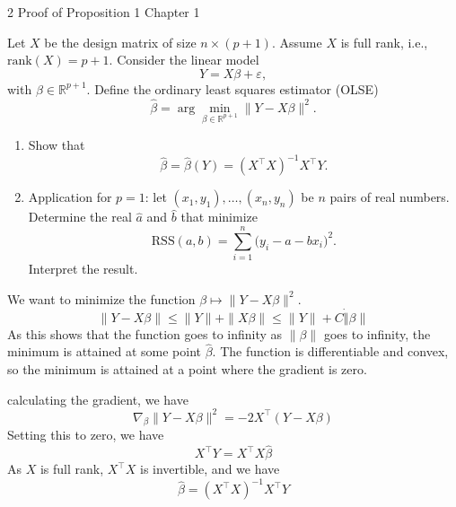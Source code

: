 \begin{exercisebox}{2 Proof of Proposition 1 Chapter 1}

  Let $X$ be the design matrix of size $n\times(p+1)$. Assume $X$ is full rank, i.e., $\mathrm{rank}(X)=p+1$. Consider the linear model
  \[
    Y = X\beta + \varepsilon,
  \]
  with $\beta\in\mathbb{R}^{p+1}$. Define the ordinary least squares estimator (OLSE)
  \[
    \widehat{\beta} = \arg\min_{\beta\in\mathbb{R}^{p+1}} \|Y - X\beta\|^2.
  \]

  \begin{enumerate}
    \item Show that
    \[
      \widehat{\beta} = \widehat{\beta}(Y) = (X^{\top}X)^{-1}X^{\top}Y.
    \]
    \item Application for $p=1$:
    let $(x_1,y_1),\ldots,(x_n,y_n)$ be $n$ pairs of real numbers. Determine the real
    $\hat a$ and $\hat b$ that minimize
    \[
      \mathrm{RSS}(a,b) = \sum_{i=1}^n \bigl(y_i - a - b x_i\bigr)^2.
    \]
    Interpret the result.
  \end{enumerate}
\end{exercisebox}

\begin{answerenum}
    \item We want to minimize the function \( \beta \mapsto \| Y - X\beta \|^2 \).
        \[
          \| Y - X\beta \| \leq \| Y \| + \| X\beta \| \leq \|Y\| + C \dot \|\beta\|
        \]
        As this shows that the function goes to infinity as \( \|\beta\| \) goes to infinity, the minimum is attained at some point \( \widehat{\beta} \). The function is differentiable and convex, so the minimum is attained at a point where the gradient is zero. 
        
        calculating the gradient, we have
        \[
          \nabla_\beta \| Y - X\beta \|^2 = -2X^{\top}(Y - X\beta)
        \]
        Setting this to zero, we have
        \[
            X^{\top}Y = X^{\top}X\widehat{\beta}
        \]
        As \( X \) is full rank, \( X^{\top}X \) is invertible, and we have
        \[
          \widehat{\beta} = (X^{\top}X)^{-1}X^{\top}Y
        \]
\end{answerenum}